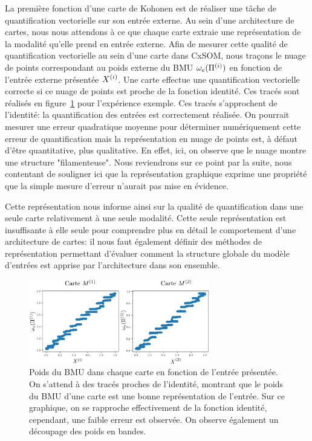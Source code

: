 \documentclass[../main]{subfiles}
\begin{document}
La première fonction d'une carte de Kohonen est de réaliser une tâche de quantification vectorielle sur son entrée externe. Au sein d'une architecture de cartes, nous nous attendons à ce que chaque carte extraie une représentation de la modalité qu'elle prend en entrée externe.
Afin de mesurer cette qualité de quantification vectorielle au sein d'une carte dans CxSOM, nous traçons le nuage de points correspondant au poids externe du BMU $\omega_e(\Pi^{({i})})$ en fonction de l'entrée externe présentée $X^{({i})}$. Une carte effectue une quantification vectorielle correcte si ce nuage de points est proche de la fonction identité.
Ces tracés sont réalisés en figure~\ref{fig:erreur} pour l'expérience exemple. Ces tracés s'approchent de l'identité: la quantification des entrées est correctement réalisée.
On pourrait mesurer une erreur quadratique moyenne pour déterminer numériquement cette erreur de quantification mais la représentation en nuage de points est, à défaut d'être quantitative, plus qualitative. En effet, ici, on observe que le nuage montre une structure "filamenteuse". Nous reviendrons sur ce point par la suite, nous contentant de souligner ici que la représentation graphique exprime une propriété que la simple mesure d'erreur n'aurait pas mise en évidence. 

Cette représentation nous informe ainsi sur la qualité de quantification dans une seule carte relativement à une seule modalité. Cette seule représentation est insuffisante à elle seule pour comprendre plus en détail le comportement d'une architecture de cartes: il nous faut également définir des méthodes de représentation permettant d'évaluer comment la structure globale du modèle d'entrées est apprise par l'architecture dans son ensemble.

\begin{figure}
    \centering
    \includegraphics[width=0.7\textwidth]{w_x.pdf}
    \caption{Poids du BMU dans chaque carte en fonction de l'entrée présentée. On s'attend à des tracés proches de l'identité, montrant que le poids du BMU d'une carte est une bonne représentation de l'entrée. Sur ce graphique, on se rapproche effectivement de la fonction identité, cependant, une faible erreur est observée. On observe également un découpage des poids en bandes.\label{fig:erreur}}
\end{figure}
\end{document}
